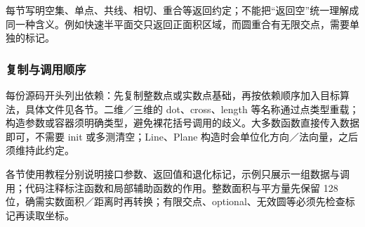 每节写明空集、单点、共线、相切、重合等返回约定；不能把“返回空”统一理解成同一种含义。例如快速半平面交只返回正面积区域，而圆重合有无限交点，需要单独的标记。

\subsubsection*{复制与调用顺序}
每份源码开头列出依赖：先复制整数点或实数点基础，再按依赖顺序加入目标算法，具体文件见各节。二维／三维的 dot、cross、length 等名称通过点类型重载；构造参数或容器须明确类型，避免裸花括号调用的歧义。大多数函数直接传入数据即可，不需要 init 或多测清空；Line、Plane 构造时会单位化方向／法向量，之后须维持此约定。

各节使用教程分别说明接口参数、返回值和退化标记，示例只展示一组数据与调用；代码注释标注函数和局部辅助函数的作用。整数面积与平方量先保留 128 位，确需实数面积／距离时再转换；有限交点、optional、无效圆等必须先检查标记再读取坐标。
